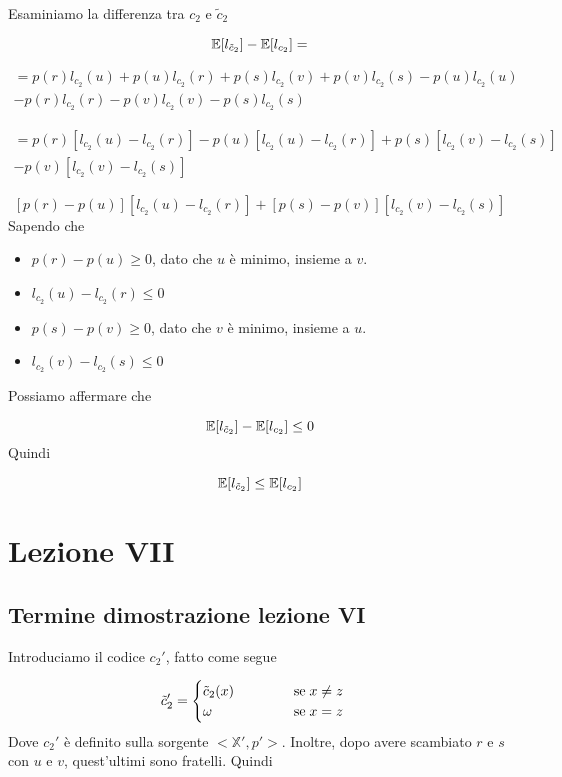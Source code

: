 \documentclass[12pt]{report}
\begin{document}
\begin{dimo}
        \noindent
        Esaminiamo la differenza tra $c_2$ e $\tilde c_2$

        $$\mathbb{E}[l_{\tilde c_2}] - \mathbb{E}[l_{c_2}] = $$

        \begin{align*}
            = p(r)l_{c_2}(u) + p(u) l_{c_2}(r) + p(s) l_{c_2}(v) + p(v) l_{c_2}(s) - p(u)l_{c_2}(u) \\ - p(r) l_{c_2}(r) - p(v) l_{c_2}(v) - p(s) l_{c_2}(s)
        \end{align*}

        \begin{align*}
            = p(r) [l_{c_2}(u) - l_{c_2}(r)] - p(u)[l_{c_2}(u) - l_{c_2}(r)] + p(s) [l_{c_2}(v) - l_{c_2}(s)]\\ - p(v)[l_{c_2}(v) - l_{c_2}(s)]
        \end{align*}

        $$[p(r) - p(u)] [l_{c_2}(u) - l_{c_2}(r)] + [p(s) - p(v)] [l_{c_2}(v) - l_{c_2}(s)]$$
        Sapendo che
        \begin{itemize}
            \item $p(r) - p(u) \geq 0$, dato che $u$ è minimo, insieme a $v$.
            \item $l_{c_2}(u) - l_{c_2}(r) \leq 0$
            \item  $p(s) - p(v) \geq 0$, dato che $v$ è minimo, insieme a $u$.
            \item $l_{c_2}(v) - l_{c_2}(s) \leq 0$
        \end{itemize}
        Possiamo affermare che

        $$\mathbb{E}[l_{\tilde c_2}] - \mathbb{E}[l_{c_2}] \leq 0$$
        Quindi

        $$\mathbb{E}[l_{\tilde c_2}] \leq \mathbb{E}[l_{c_2}] $$


    \end{dimo}


    \chapter{Lezione VII}

    \section{Termine dimostrazione lezione VI}
    Introduciamo il codice $c_2'$, fatto come segue

    $$ \tilde c_2' = \begin{cases}
                         \tilde c_2(x) \hspace{40px} \;\text{se}\;x \neq z\\
                         \omega  \hfill \; \text{se} \; x = z \\
    \end{cases}$$
    Dove $c_2'$ è definito sulla sorgente $<\! \mathbb{X}',p'\!>$. Inoltre, dopo avere scambiato $r$ e $s$ con $u$ e $v$, quest'ultimi sono fratelli. Quindi
\end{document}
